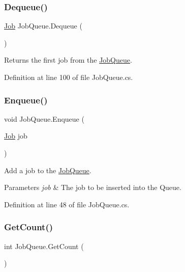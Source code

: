 \subsubsection{\texorpdfstring{Dequeue()}{Dequeue()}}
{\footnotesize\ttfamily \hyperlink{class_job}{Job} Job\+Queue.\+Dequeue (\begin{DoxyParamCaption}{ }\end{DoxyParamCaption})}



Returns the first job from the \hyperlink{class_job_queue}{Job\+Queue}. 



Definition at line 100 of file Job\+Queue.\+cs.

\mbox{\label{class_job_queue_a1ad28f817250ffe648245c2ec76d1aa1}} 
\subsubsection{\texorpdfstring{Enqueue()}{Enqueue()}}
{\footnotesize\ttfamily void Job\+Queue.\+Enqueue (\begin{DoxyParamCaption}\item[{\hyperlink{class_job}{Job}}]{job }\end{DoxyParamCaption})}



Add a job to the \hyperlink{class_job_queue}{Job\+Queue}. 


\begin{DoxyParams}{Parameters}
{\em job} & The job to be inserted into the Queue.\\
\hline
\end{DoxyParams}


Definition at line 48 of file Job\+Queue.\+cs.

\mbox{\label{class_job_queue_ad9731c29b4830c04c1dd2f8f76cfd122}} 
\subsubsection{\texorpdfstring{Get\+Count()}{GetCount()}}
{\footnotesize\ttfamily int Job\+Queue.\+Get\+Count (\begin{DoxyParamCaption}{ }\end{DoxyParamCaption})}



